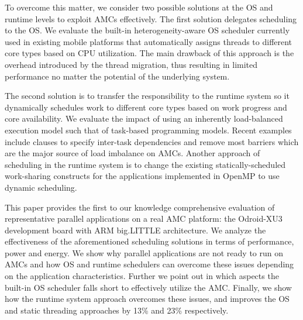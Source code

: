 To overcome this matter, we consider two possible solutions at the OS and runtime levels to exploit AMCs effectively.
The first solution delegates scheduling to the OS.
We evaluate the built-in heterogeneity-aware OS scheduler currently used in existing mobile platforms that automatically assigns threads to different core types based on CPU utilization. 
The main drawback of this approach is the overhead introduced by the thread migration, thus resulting in limited performance no matter the potential of the underlying system.

The second solution is to transfer the responsibility to the runtime system so it dynamically schedules work to different core types based on work progress and core availability. 
We evaluate the impact of using an inherently load-balanced execution model such that of task-based programming models. 
Recent examples~\cite{Ayguade:TPDS2009, OpenMP4.0:Manual2013, OmpSs_PPL11, vectorMulticore, Bauer.2012.SC,rollback,Vandierendonck:PACT2011, Vandierendonck:Hyperq,spawn} include clauses to specify inter-task dependencies and remove most barriers which are the major source of load imbalance on AMCs.
Another approach of scheduling in the runtime system is to change the existing statically-scheduled work-sharing constructs for the applications implemented in OpenMP to use dynamic scheduling. 

This paper provides the first to our knowledge comprehensive evaluation of representative parallel applications on a real AMC platform: the Odroid-XU3 development board with ARM big.LITTLE architecture.
We analyze the effectiveness of the aforementioned scheduling solutions in terms of performance, power and energy.
We show why parallel applications are not ready to run on AMCs and how OS and runtime schedulers can overcome these issues depending on the application characteristics.
Further we point out in which aspects the built-in OS scheduler falls short to effectively utilize the AMC.
Finally, we show how the runtime system approach overcomes these issues, and improves the OS and static threading approaches by 13\% and 23\% respectively.


